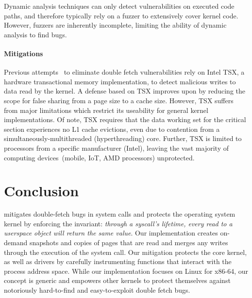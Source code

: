 \documentclass[letterpaper,twocolumn,10pt]{article}
\begin{document}
Dynamic analysis techniques can only detect vulnerabilities on executed code
paths, and therefore typically rely on a fuzzer to extensively cover kernel code.
However, fuzzers are inherently incomplete, limiting the ability of dynamic
analysis to find bugs.


\paragraph{Mitigations}
%
Previous attempts~\cite{schwartzDECAF,dftinker} to eliminate double fetch
vulnerabilities rely on Intel TSX, a hardware transactional
memory implementation, to detect malicious writes to data read by the
kernel.
A defense based on TSX improves upon \midas by reducing the scope for
false sharing from a page size to a cache size.
However, TSX suffers from major limitations which restrict its useability
for general kernel implementations.
Of note, TSX requires that the data working set for the critical section
experiences no L1 cache evictions, even due to contention from a
simultaneously-multithreaded (hyperthreading) core.
Further, TSX is limited to processors from a specific manufacturer (Intel),
leaving the vast majority
of computing devices~(mobile, IoT, AMD processors) unprotected.

\section{Conclusion}

\midas mitigates double-fetch bugs in system calls and protects the operating
system kernel by enforcing the invariant:  \emph{through a syscall's
lifetime, every read to a userspace object will return the same value}.
Our \midas implementation creates on-demand snapshots and copies of pages that
are read and merges any writes through the execution of the system call.
%
Our mitigation protects the core kernel, as well as drivers by carefully
instrumenting functions that interact with the process address space. While our
implementation focuses on Linux for x86-64, our concept is generic and empowers
other kernels to protect themselves against notoriously hard-to-find and
easy-to-exploit double fetch bugs.
\end{document}
